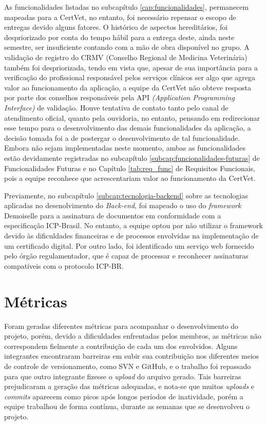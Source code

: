 \documentclass[
    12pt,               %
    openright,          %
    oneside,
    a4paper,            %
    BIBLATEX,           %
    TODO,               %
    english,            %
    brazil              %
    ]{ifsp-spo-inf-ctds}
\begin{document}
    As funcionalidades listadas no subcapítulo \ref{cap:funcionalidades}, permanecem mapeadas para a CertVet, no entanto, foi necessário repensar o escopo de entregas devido alguns fatores. O histórico de aspectos hereditários, foi despriorizado por conta do tempo hábil para a entrega deste, ainda neste semestre, ser insuficiente contando com a mão de obra disponível no grupo. A validação de registro do CRMV (Conselho Regional de Medicina Veterinária) também foi despriorizada, tendo em vista que, apesar de sua importância para a verificação do profissional responsável pelos serviços clínicos ser algo que agrega valor ao funcionamento da aplicação, a equipe da CertVet não obteve resposta por parte dos conselhos responsáveis pela API \emph{(Application Programming Interface)} de validação. Houve tentativa de contato tanto pelo canal de atendimento oficial, quanto pela ouvidoria, no entanto, pensando em redirecionar esse tempo para o desenvolvimento das demais funcionalidades da aplicação, a decisão tomada foi a de postergar o desenvolvimento de tal funcionalidade.
    Embora não sejam implementadas neste momento, ambas as funcionalidades estão devidamente registradas no subcapítulo \ref{subcap:funcionalidades-futuras} de Funcionalidades Futuras e no Capítulo \ref{tab:req_func} de Requisitos Funcionais, pois a equipe reconhece que acrescentariam valor ao funcionamento da CertVet.

    Previamente, no subcapítulo \ref{subcap:tecnologia-backend} sobre as tecnologias aplicadas no desenolvimento do \emph{Back-end}, foi mapeado o uso do \emph{framework} Demoiselle para a assinatura de documentos em conformidade com a especificação ICP-Brasil. No entanto, a equipe optou por não utilizar o framework devido às dificuldades financeiras e de processos envolvidas na implementação de um certificado digital. Por outro lado, foi identificado um serviço web fornecido pelo órgão regulamentador, que é capaz de processar e reconhecer assinaturas compatíveis com o protocolo ICP-BR.


\section{Métricas}

    Foram geradas diferentes métricas para acompanhar o desenvolvimento do projeto, porém, devido a dificuldades enfrentadas pelos membros, as métricas não correspondem fielmente a contribuição de cada um dos envolvidos. Alguns integrantes encontraram barreiras em subir sua contribuição nos diferentes meios de controle de versionamento, como SVN e GitHub, e o trabalho foi repassado para que outro integrante fizesse o \emph{upload} do arquivo gerado.
    Tais barreiras prejudicaram a geração das métricas adequadas, e nota-se que muitos \emph{uploads} e \emph{commits} aparecem como picos após longos períodos de inatividade, porém a equipe trabalhou de forma contínua, durante as semanas que se desenvolveu o projeto. 
    
\end{document}
